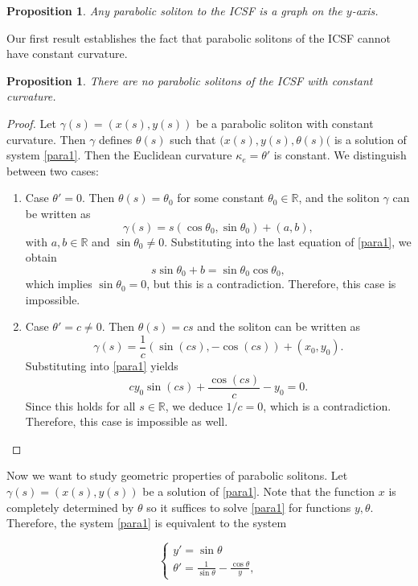 \documentclass[12pt]{amsart}
\theoremstyle{plain}
\newtheorem{proposition}[theorem]{Proposition}
\theoremstyle{definition}
\def\r{\mathbb R}
\begin{document}
\begin{proposition}\label{prg}
 Any parabolic soliton to the ICSF is a graph on the $y$-axis.
\end{proposition}

Our first result establishes the fact that parabolic solitons of the ICSF cannot have constant curvature.

\begin{proposition}
There are no parabolic solitons of the ICSF with constant curvature.
\end{proposition}

\begin{proof} 
Let $\gamma(s)=(x(s),y(s))$ be a parabolic soliton with constant curvature. Then $\gamma$ defines $\theta(s)$ such that $(x(s),y(s),\theta(s)($ is a  solution of system \eqref{para1}. Then the Euclidean curvature $\kappa_e = \theta'$ is constant. We distinguish between two cases:
\begin{enumerate}
\item Case $\theta' = 0$. Then $\theta(s) = \theta_0$ for some constant $\theta_0\in\r$, and the soliton $\gamma$ can be written as 
 $$\gamma(s) = s  (\cos\theta_0 , \sin\theta_0 ) + (a,b),$$
 with $a,b\in\r$ and  $\sin\theta_0\not=0$. 
Substituting into the last equation of \eqref{para1}, we obtain 
$$ s \sin\theta_0 +b = \sin\theta_0   \cos\theta_0,$$
which implies $\sin\theta_0 = 0$, but this is a contradiction. Therefore, this case is impossible.

\item Case $\theta' = c\not=0$. Then $\theta(s) = cs$ and the soliton can be written as 
$$\gamma(s) = \frac{1}{c} (\sin(cs), -\cos(cs)) + (x_0,y_0).$$
Substituting into \eqref{para1} yields
$$ c y_0 \sin(cs) + \frac{\cos(cs)}{c} - y_0=0.$$
Since this holds for all $s\in\r$, we deduce $1/c=0$, which is a contradiction. Therefore, this case is impossible as well. 
\end{enumerate}
\end{proof}


Now we want to study geometric properties of parabolic solitons. Let $\gamma(s)=(x(s),y(s))$ be a solution of \eqref{para1}. Note that the function $x$ is completely determined by $\theta$ so it suffices to solve \eqref{para1} for functions $y,\theta$. Therefore, the system \eqref{para1} is equivalent to the system

\begin{equation}
\label{para2}
\begin{cases}
y' = \sin\theta \\
\displaystyle \theta' =  \frac{1}{\sin\theta} - \frac{\cos\theta}{y},
\end{cases}
\end{equation}
\end{document}
